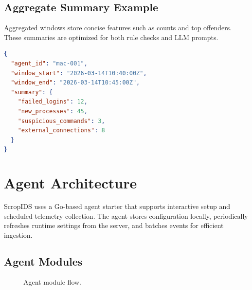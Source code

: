 \documentclass[conference]{IEEEtran}
\begin{document}
\subsection{Aggregate Summary Example}
Aggregated windows store concise features such as counts and top offenders. These summaries are optimized for both rule checks and LLM prompts.
\begin{lstlisting}[language=json,caption={Aggregated window example}]
{
  "agent_id": "mac-001",
  "window_start": "2026-03-14T10:40:00Z",
  "window_end": "2026-03-14T10:45:00Z",
  "summary": {
    "failed_logins": 12,
    "new_processes": 45,
    "suspicious_commands": 3,
    "external_connections": 8
  }
}
\end{lstlisting}
\FloatBarrier

\section{Agent Architecture}
ScropIDS uses a Go-based agent starter that supports interactive setup and scheduled telemetry collection. The agent stores configuration locally, periodically refreshes runtime settings from the server, and batches events for efficient ingestion.

\subsection{Agent Modules}
\begin{figure}[!t]
\centering
{}
\caption{Agent module flow.}
\label{fig:agent-modules}
\end{figure}
\end{document}
